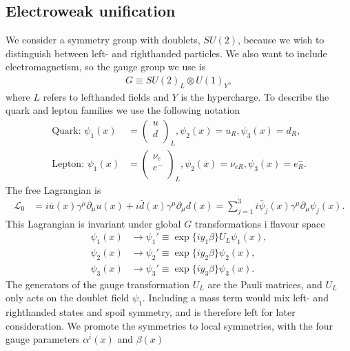 \documentclass[11pt]{article}
\begin{document}
\begin{multicols}{2}
\subsection*{Electroweak unification}
\begin{flushleft}
We consider a symmetry group with doublets, $SU(2)$, because we wish to distinguish between left- and righthanded particles. We also want to include electromagnetism, so the gauge group we use is
\begin{align}
G \equiv SU(2)_L \otimes U(1)_Y,
\end{align}
where $L$ refers to lefthanded fields and $Y$ is the hypercharge. To describe the quark and lepton families we use the following notation
\begin{align}
\text{Quark: }\psi_1(x)&= \begin{pmatrix}
u\\
d\\
\end{pmatrix}_L, 
\psi_2(x)=u_R, \psi_3 (x) = d_R,\\
\text{Lepton: } \psi_1(x) &= \begin{pmatrix}
\nu_e\\
e^-\\
\end{pmatrix}_L, \psi_2 (x) = \nu_{eR}, \psi_3(x)=e^-_R.
\end{align}
The free Lagrangian is
\begin{align*}
\mathcal{L}_0 &= i \bar{u}(x) \gamma^{\mu} \partial_{\mu} u(x) + i \bar{d}(x) \gamma^{\mu} \partial_{\mu} d(x)= \sum_{j=1}^3 i \bar{\psi}_j(x) \gamma^{\mu} \partial_{\mu} \psi_j(x).
\end{align*}
This Lagrangian is invariant under global $G$ transformations i flavour space
\begin{align*}
\psi_1(x) &\rightarrow \psi_1' \equiv \exp\{iy_1 \beta\} U_L \psi_1(x),\\
\psi_2(x) &\rightarrow \psi_2' \equiv \exp\{iy_2 \beta\} \psi_2(x),\\
\psi_3(x) &\rightarrow \psi_3' \equiv \exp\{iy_3 \beta\}\psi_3(x).
\end{align*}
The generators of the gauge transformation $U_L$ are the Pauli matrices, and $U_L$ only acts on the doublet field $\psi_1$. Including a mass term would mix left- and righthanded states and spoil symmetry, and is therefore left for later consideration. We promote the symmetries to local symmetries, with the four gauge parameters $\alpha^i(x)$ and $\beta (x)$
\begin{align*}

\end{align*}
\end{flushleft}
\end{multicols}
\end{document}
